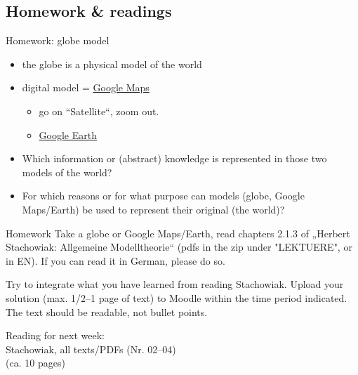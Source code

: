 

\subsection{Homework \& readings}

\begin{frame}{Homework: globe model}
\begin{itemize}
    \item the globe is a physical model of the world
    \item digital model = \href{https://www.google.at/maps/}{Google Maps}
    \begin{itemize}
        \item go on “Satellite“, zoom out.
        \item \href{https://earth.google.com}{Google Earth}
    \end{itemize}
    \item Which information or (abstract) knowledge is represented in those two models of the world?
    \item For which reasons or for what purpose can models (globe, Google Maps/Earth) be used to represent their original (the world)?
\end{itemize}

\begin{alertblock}{Homework} \footnotesize
Take a globe or Google Maps/Earth, read chapters 2.1.3 of „Herbert Stachowiak: Allgemeine Modelltheorie“ (pdfs in the zip under "LEKTUERE", or in EN). If you can read it in German, please do so. 

Try to integrate what you have learned from reading Stachowiak.
Upload your solution (max. 1/2--1 page of text) to Moodle within the time period indicated.
The text should be readable, not bullet points. 
\end{alertblock}
\end{frame}

\begin{frame}[standout]
    \alert{Reading} for next week: \\
    Stachowiak, all texts/PDFs (Nr. 02--04) \\
    \small (ca. 10 pages) 
\end{frame}
